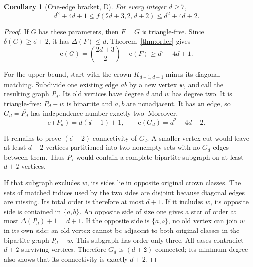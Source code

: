 \documentclass[11pt]{article}
\newtheorem{corollary}[theorem]{Corollary}
\theoremstyle{remark}
\newcommand{\e}{\mathrm{e}}
\begin{document}
\begin{corollary}[One-edge bracket, D]\label{cor:bj}
For every integer $d\ge7$,
\begin{equation}\label{eq:bracket}
d^2+4d+1\le f(2d+3,2,d+2)\le d^2+4d+2.
\end{equation}
\end{corollary}
\begin{proof}
If $G$ has these parameters, then $F=\overline G$ is triangle-free. Since $\delta(G)\ge d+2$, it has $\Delta(F)\le d$. Theorem~\ref{thm:order} gives
\begin{equation}
\e(G)=\binom{2d+3}{2}-\e(F)\ge d^2+4d+1.
\end{equation}

For the upper bound, start with the crown $K_{d+1,d+1}$ minus its diagonal matching. Subdivide one existing edge $ab$ by a new vertex $w$, and call the resulting graph $P_d$. Its old vertices have degree $d$ and $w$ has degree two. It is triangle-free: $P_d-w$ is bipartite and $a,b$ are nonadjacent. It has an edge, so $G_d=\overline{P_d}$ has independence number exactly two. Moreover,
\begin{equation}
\e(P_d)=d(d+1)+1,\qquad \e(G_d)=d^2+4d+2.
\end{equation}

It remains to prove $(d+2)$-connectivity of $G_d$. A smaller vertex cut would leave at least $d+2$ vertices partitioned into two nonempty sets with no $G_d$ edges between them. Thus $P_d$ would contain a complete bipartite subgraph on at least $d+2$ vertices.

If that subgraph excludes $w$, its sides lie in opposite original crown classes. The sets of matched indices used by the two sides are disjoint because diagonal edges are missing. Its total order is therefore at most $d+1$.
If it includes $w$, its opposite side is contained in $\{a,b\}$. An opposite side of size one gives a star of order at most $\Delta(P_d)+1=d+1$. If the opposite side is $\{a,b\}$, no old vertex can join $w$ in its own side: an old vertex cannot be adjacent to both original classes in the bipartite graph $P_d-w$. This subgraph has order only three. All cases contradict $d+2$ surviving vertices. Therefore $G_d$ is $(d+2)$-connected; its minimum degree also shows that its connectivity is exactly $d+2$.
\end{proof}
\end{document}
